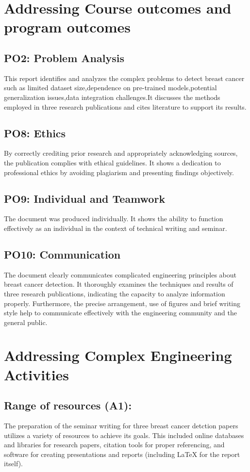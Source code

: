 \documentclass[12]{article}
\begin{document}
\section{Addressing Course outcomes and program outcomes}
\subsection{PO2: Problem Analysis}
This report identifies and analyzes the complex problems to detect breast cancer such as limited dataset size,dependence on pre-trained models,potential generalization issues,data integration challenges.It discusses the methods employed in three research publications and cites literature to support its results.

\subsection{PO8: Ethics}
By correctly crediting prior research and appropriately acknowledging sources, the publication complies with ethical guidelines. It shows a dedication to professional ethics by avoiding plagiarism and presenting findings objectively.

\subsection{PO9: Individual and Teamwork}
The  document was produced individually. It shows  the ability to function effectively as an individual in the context of technical writing and seminar.

\subsection{PO10: Communication}
The document clearly communicates complicated engineering principles about breast cancer detection. It thoroughly examines the techniques and results of three research publications, indicating the  capacity to analyze information properly. Furthermore, the precise arrangement, use of figures and brief writing style help to communicate effectively with the engineering community and the general public.

\section{Addressing Complex Engineering Activities}

\subsection{Range of resources (A1):} 
The  preparation of the seminar writing for three breast cancer detction papers utilizes  a variety of resources to achieve its goals. This included online databases and libraries for research papers, citation tools for proper referencing, and software for creating presentations and reports (including LaTeX for the report itself).
\end{document}
